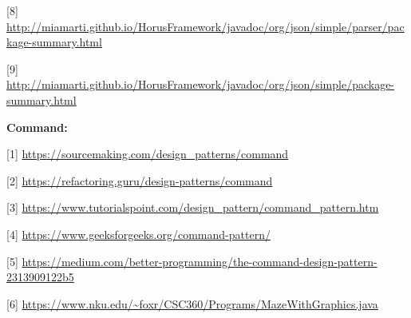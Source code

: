 \documentclass[10pt,portuguese]{article}
\begin{document}
[8] \url{http://miamarti.github.io/HorusFramework/javadoc/org/json/simple/parser/package-summary.html}

[9] \url{http://miamarti.github.io/HorusFramework/javadoc/org/json/simple/package-summary.html}


\par \textbf{Command:}

[1] \url{https://sourcemaking.com/design_patterns/command}

[2] \url{https://refactoring.guru/design-patterns/command}

[3] \url{https://www.tutorialspoint.com/design_pattern/command_pattern.htm}

[4] \url{https://www.geeksforgeeks.org/command-pattern/}

[5] \url{https://medium.com/better-programming/the-command-design-pattern-2313909122b5}

[6] \url{https://www.nku.edu/~foxr/CSC360/Programs/MazeWithGraphics.java}
\end{document}
